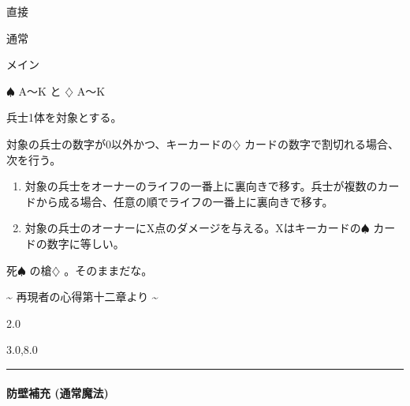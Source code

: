 \documentclass[letterpaper,10pt,dvipdfmx]{sphinxmanual}
\begin{document}
\sphinxAtStartPar
{} 直接

\sphinxAtStartPar
{} 通常

\sphinxAtStartPar
{} メイン

\sphinxAtStartPar
{} {\normalsize $\spadesuit$} A〜K と {\normalsize $\diamondsuit$} A〜K

\sphinxAtStartPar
{}

\sphinxAtStartPar
兵士1体を対象とする。

\sphinxAtStartPar
{}

\sphinxAtStartPar
対象の兵士の数字が0以外かつ、キーカードの{\normalsize $\diamondsuit$} カードの数字で割切れる場合、次を行う。
\begin{enumerate}
%
\item {} 
\sphinxAtStartPar
対象の兵士をオーナーのライフの一番上に裏向きで移す。兵士が複数のカードから成る場合、任意の順でライフの一番上に裏向きで移す。

\item {} 
\sphinxAtStartPar
対象の兵士のオーナーにX点のダメージを与える。Xはキーカードの{\normalsize $\spadesuit$} カードの数字に等しい。

\end{enumerate}

\sphinxAtStartPar
{}

\sphinxAtStartPar
死{\normalsize $\spadesuit$} の槍{\normalsize $\diamondsuit$} 。そのままだな。

\sphinxAtStartPar
{}

\sphinxAtStartPar
{}

\sphinxAtStartPar
\textasciitilde{} 再現者の心得第十二章より \textasciitilde{}

\sphinxAtStartPar
{}  2.0

\sphinxAtStartPar
{}  3.0,8.0


\bigskip\hrule\bigskip



\paragraph{防壁補充 (通常魔法)}
\label{\detokenize{auto/actionlist:act-addbulwark}}\label{\detokenize{auto/actionlist:id35}}
\sphinxAtStartPar
{}
\end{document}
